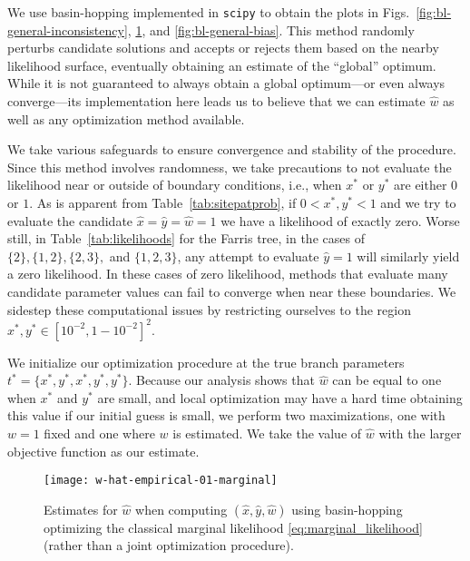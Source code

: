 We use basin-hopping \cite{Wales1997} implemented in \texttt{scipy} \cite{Jones2001} to obtain the plots in Figs.~\ref{fig:bl-general-inconsistency}, \ref{fig:bl-general-marginal}, and \ref{fig:bl-general-bias}.
This method randomly perturbs candidate solutions and accepts or rejects them based on the nearby likelihood surface, eventually obtaining an estimate of the ``global'' optimum.
While it is not guaranteed to always obtain a global optimum---or even always converge---its implementation here leads us to believe that we can estimate $\hat{w}$ as well as any optimization method available.

We take various safeguards to ensure convergence and stability of the procedure.
Since this method involves randomness, we take precautions to not evaluate the likelihood near or outside of boundary conditions, i.e., when $x^*$ or $y^*$ are either $0$ or $1$.
As is apparent from Table~\ref{tab:sitepatprob}, if $0 < x^*, y^* < 1$ and we try to evaluate the candidate $\hat{x}=\hat{y}=\hat{w}=1$ we have a likelihood of exactly zero.
Worse still, in Table~\ref{tab:likelihoods} for the Farris tree, in the cases of $\{2\}, \{1,2\}, \{2,3\},$ and $\{1,2,3\}$, any attempt to evaluate $\hat{y}=1$ will similarly yield a zero likelihood.
In these cases of zero likelihood, methods that evaluate many candidate parameter values can fail to converge when near these boundaries.
We sidestep these computational issues by restricting ourselves to the region $x^*,y^*\in [10^{-2},1-10^{-2}]^2$.

We initialize our optimization procedure at the true branch parameters $t^*=\{x^*,y^*,x^*,y^*,y^*\}$.
Because our analysis shows that $\hat{w}$ can be equal to one when $x^*$ and $y^*$ are small, and local optimization may have a hard time obtaining this value if our initial guess is small, we perform two maximizations, one with $w=1$ fixed and one where $w$ is estimated.
We take the value of $\hat{w}$ with the larger objective function as our estimate.

\begin{figure}
\centering
\texttt{[image: w-hat-empirical-01-marginal]}
\caption{
    Estimates for $\hat{w}$ when computing $(\hat{x}, \hat{y}, \hat{w})$ using basin-hopping \cite{Wales1997} optimizing the classical marginal likelihood \eqref{eq:marginal_likelihood} (rather than a joint optimization procedure).
}
\label{fig:bl-general-marginal}
\end{figure}


